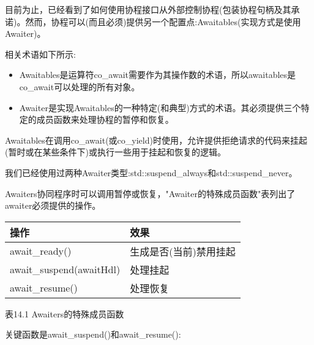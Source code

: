 

目前为止，已经看到了如何使用协程接口从外部控制协程(包装协程句柄及其承诺)。然而，协程可以(而且必须)提供另一个配置点:Awaitables(实现方式是使用Awaiter)。

相关术语如下所示:

\begin{itemize}
\item
Awaitables是运算符co\_await需要作为其操作数的术语，所以awaitables是co\_await可以处理的所有对象。

\item
Awaiter是实现Awaitables的一种特定(和典型)方式的术语。其必须提供三个特定的成员函数来处理协程的暂停和恢复。
\end{itemize}

Awaitables在调用co\_await(或co\_yield)时使用，允许提供拒绝请求的代码来挂起(暂时或在某些条件下)或执行一些用于挂起和恢复的逻辑。

我们已经使用过两种Awaiter类型:std::suspend\_always和std::suspend\_never。


Awaiters协同程序时可以调用暂停或恢复，"Awaiter的特殊成员函数"表列出了awaiter必须提供的操作。

\begin{longtable}[c]{|l|l|}
\hline
\textbf{操作}       & \textbf{效果}                                   \\ \hline
\endfirsthead
%
\endhead
%
await\_ready()           & 生成是否(当前)禁用挂起 \\ \hline
await\_suspend(awaitHdl) & 处理挂起                                 \\ \hline
await\_resume()          & 处理恢复                                 \\ \hline
\end{longtable}

\begin{center}
表14.1 Awaiters的特殊成员函数
\end{center}

关键函数是await\_suspend()和await\_resume():


